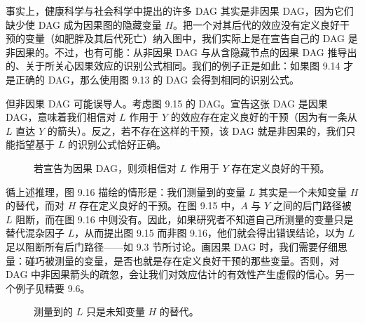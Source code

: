 事实上，健康科学与社会科学中提出的许多 DAG 其实是非因果 DAG，因为它们缺少使 DAG 成为因果图的隐藏变量 $H$。把一个对其后代的效应没有定义良好干预的变量（如肥胖及其后代死亡）纳入图中，我们实际上是在宣告自己的 DAG 是非因果的。不过，也有可能：从非因果 DAG 与从含隐藏节点的因果 DAG 推导出的、关于所关心因果效应的识别公式相同。我们的例子正是如此：如果图 9.14 才是正确的 DAG，那么使用图 9.13 的 DAG 会得到相同的识别公式。

但非因果 DAG 可能误导人。考虑图 9.15 的 DAG。宣告这张 DAG 是因果 DAG，意味着我们相信对 $L$ 作用于 $Y$ 的效应存在定义良好的干预（因为有一条从 $L$ 直达 $Y$ 的箭头）。反之，若不存在这样的干预，该 DAG 就是非因果的，我们只能指望基于 $L$ 的识别公式恰好正确。

\begin{figure}[htbp]
\centering
{}
\caption{若宣告为因果 DAG，则须相信对 $L$ 作用于 $Y$ 存在定义良好的干预。}
\label{fig:9.15}
\end{figure}

循上述推理，图 9.16 描绘的情形是：我们测量到的变量 $L$ 其实是一个未知变量 $H$ 的替代，而对 $H$ 存在定义良好的干预。在图 9.15 中，$A$ 与 $Y$ 之间的后门路径被 $L$ 阻断，而在图 9.16 中则没有。因此，如果研究者不知道自己所测量的变量只是替代混杂因子 $L$，从而提出图 9.15 而非图 9.16，他们就会得出错误结论，以为 $L$ 足以阻断所有后门路径——如 9.3 节所讨论。画因果 DAG 时，我们需要仔细思量：碰巧被测量的变量，是否也就是存在定义良好干预的那些变量。否则，对 DAG 中非因果箭头的疏忽，会让我们对效应估计的有效性产生虚假的信心。另一个例子见精要 9.6。

\begin{figure}[htbp]
\centering
{}
\caption{测量到的 $L$ 只是未知变量 $H$ 的替代。}
\label{fig:9.16}
\end{figure}

